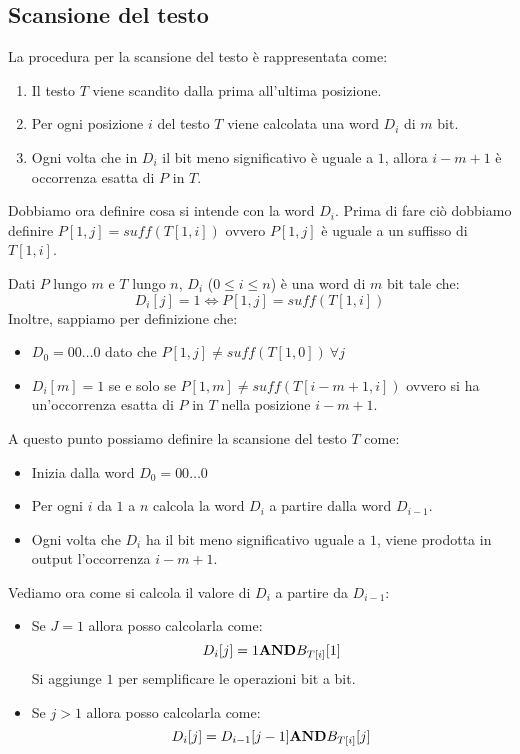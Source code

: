 \subsection{Scansione del testo}
La procedura per la scansione del testo è rappresentata come:
\begin{enumerate}
    \item Il testo $T$ viene scandito dalla prima all'ultima posizione.
    \item Per ogni posizione $i$ del testo $T$ viene calcolata una word $D_i$ di $m$ bit.
    \item Ogni volta che in $D_i$ il bit meno significativo è uguale a $1$, allora
          $i - m + 1$ è occorrenza esatta di $P$ in $T$.
\end{enumerate}
Dobbiamo ora definire cosa si intende con la word $D_i$. Prima di fare ciò dobbiamo
definire $P[1,j] = suff(T[1,i])$ ovvero $P[1,j]$ è uguale a un suffisso di $T[1,i]$.
\begin{definizione}
    Dati $P$ lungo $m$ e $T$ lungo $n$, $D_i$ ($0 \leq i \leq n$) è una word di
    $m$ bit tale che:
    \begin{equation}
        D_i[j] = 1 \iff P[1,j] = suff(T[1,i])
    \end{equation}
    Inoltre, sappiamo per definizione che:
    \begin{itemize}
        \item $D_0 = 00\dots0$ dato che $P[1, j] \neq suff(T[1, 0]) \ \forall j$
        \item $D_i[m] = 1$ se e solo se $P[1, m] \neq suff(T[i-m + 1, i])$ ovvero
              si ha un’occorrenza esatta di $P$ in $T$ nella posizione $i - m + 1$.
    \end{itemize}
\end{definizione}
A questo punto possiamo definire la scansione del testo $T$ come:
\begin{itemize}
    \item Inizia dalla word $D_0 = 00\dots0$
    \item Per ogni $i$ da $1$ a $n$ calcola la word $D_i$ a partire dalla word $D_{i-1}$.
    \item Ogni volta che $D_i$ ha il bit meno significativo uguale a $1$, viene
          prodotta in output l'occorrenza $i- m + 1$.
\end{itemize}
Vediamo ora come si calcola il valore di $D_i$ a partire da $D_{i - 1}$:
\begin{itemize}
    \item Se $J =  1$ allora posso calcolarla come:
          \begin{equation}
              D_i[j] = 1 \text{\textbf{AND}} B_{T[i]}[1]
          \end{equation}
          Si aggiunge $1$ per semplificare le operazioni bit a bit.
    \item Se $j > 1$ allora posso calcolarla come:
          \begin{equation}
              D_i[j] = D_{i - 1}[j - 1] \text{\textbf{AND}} B_{T[i]}[j]
          \end{equation}
\end{itemize}
